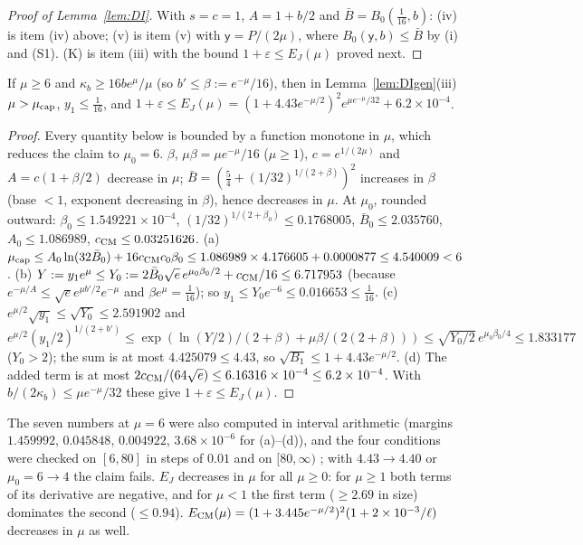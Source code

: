 \begin{proof}[Proof of Lemma~\ref{lem:DI}]
With $s=c=1$, $A=1+b/2$ and $\bar B=B_0(\frac1{16},b)$: (iv) is item (iv) above; (v) is item (v) with $\mathsf y=P/(2\mu)$, where $B_0(\mathsf y,b)\le\bar B$ by (i) and (S1).
(K) is item (iii) with the bound $1+\varepsilon\le E_J(\mu)$ proved next.
\end{proof}

\begin{lemma} \proofst
\label{lem:EJ}
If $\mu\ge6$ and $\kappa_b\ge16be^{\mu}/\mu$ (so $b'\le\beta:=e^{-\mu}/16$), then in Lemma~\ref{lem:DIgen}(iii) $\mu>\mu_{\rm cap}$, $y_1\le\frac1{16}$, and $1+\varepsilon\le E_J(\mu)=(1+4.43e^{-\mu/2})^2e^{\mu e^{-\mu}/32}+6.2\times10^{-4}$.
\end{lemma}
\begin{proof}
Every quantity below is bounded by a function monotone in $\mu$, which reduces the claim to $\mu_0=6$.
$\beta$, $\mu\beta=\mu e^{-\mu}/16$ ($\mu\ge1$), $c=e^{1/(2\mu)}$ and $A=c(1+\beta/2)$ decrease in $\mu$; $\bar B=(\frac54+(1/32)^{1/(2+\beta)})^2$ increases in $\beta$ (base $<1$, exponent decreasing in $\beta$), hence decreases in $\mu$.
At $\mu_0$, rounded outward: $\beta_0\le1.549221\times10^{-4}$, $(1/32)^{1/(2+\beta_0)}\le0.1768005$, $\bar B_0\le2.035760$, $A_0\le1.086989$, $c_{\rm CM}\le0.03251626$.
(a) $\mu_{\rm cap}\le A_0\ln(32\bar B_0)+16c_{\rm CM}c_0\beta_0\le1.086989\times4.176605+0.0000877\le4.540009<6$.
(b) $Y:=y_1e^{\mu}\le Y_0:=2\bar B_0\sqrt e\,e^{\mu_0\beta_0/2}+c_{\rm CM}/16\le6.717953$ (because $e^{-\mu/A}\le\sqrt ee^{\mu b'/2}e^{-\mu}$ and $\beta e^{\mu}=\frac1{16}$); so $y_1\le Y_0e^{-6}\le0.016653\le\frac1{16}$.
(c) $e^{\mu/2}\sqrt{y_1}\le\sqrt{Y_0}\le2.591902$ and $e^{\mu/2}(y_1/2)^{1/(2+b')}\le\exp(\ln(Y/2)/(2+\beta)+\mu\beta/(2(2+\beta)))\le\sqrt{Y_0/2}\,e^{\mu_0\beta_0/4}\le1.833177$ ($Y_0>2$); the sum is at most $4.425079\le4.43$, so $\sqrt{B_1}\le1+4.43e^{-\mu/2}$.
(d) The added term is at most $2c_{\rm CM}/(64\sqrt e)\le6.16316\times10^{-4}\le6.2\times10^{-4}$.
With $b/(2\kappa_b)\le\mu e^{-\mu}/32$ these give $1+\varepsilon\le E_J(\mu)$.
\end{proof}
The seven numbers at $\mu=6$ were also computed in interval arithmetic (margins $1.459992$, $0.045848$, $0.004922$, $3.68\times10^{-6}$ for (a)--(d)), and the four conditions were checked on $[6,80]$ in steps of $0.01$ and on $[80,\infty)$ \numst; with $4.43\to4.40$ or $\mu_0=6\to4$ the claim fails.
$E_J$ decreases in $\mu$ for all $\mu\ge0$: for $\mu\ge1$ both terms of its derivative are negative, and for $\mu<1$ the first term ($\ge2.69$ in size) dominates the second ($\le0.94$).
$E_{\rm CM}(\mu)=(1+3.445e^{-\mu/2})^2(1+2\times10^{-3}/\ell)$ decreases in $\mu$ as well.

